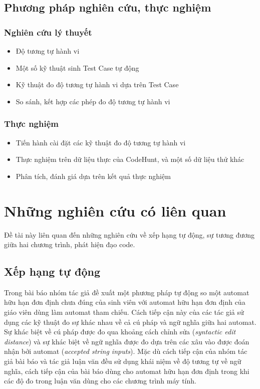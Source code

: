 \subsection*{Phương pháp nghiên cứu, thực nghiệm}
\subsubsection*{Nghiên cứu lý thuyết}
\begin{itemize}
\item Độ tương tự hành vi
\item Một số kỹ thuật sinh Test Case tự động
\item Kỹ thuật đo độ tương tự hành vi dựa trên Test Case
\item So sánh, kết hợp các phép đo độ tương tự hành vi
\end{itemize}
		
\subsubsection*{Thực nghiệm}
\begin{itemize}
\item Tiến hành cài đặt các kỹ thuật đo độ tương tự hành vi
\item Thực nghiệm trên dữ liệu thực của CodeHunt, và một số dữ liệu thử khác
\item Phân tích, đánh giá dựa trên kết quả thực nghiệm
\end{itemize}


\section{Những nghiên cứu có liên quan}

Đề tài này liên quan đến những nghiên cứu về xếp hạng tự động, sự
tương đương giữa hai chương trình, phát hiện đạo code.

\subsection*{Xếp hạng tự động}
	
Trong bài báo \cite{alur2013automated} nhóm tác giả đề xuất một phương
pháp tự động so một automat hữu hạn đơn định chưa đúng của sinh viên
với automat hữu hạn đơn định của giáo viên dùng làm automat tham
chiếu. Cách tiếp cận này của các tác giả sử dụng các kỹ thuật đo sự
khác nhau về cả cú pháp và ngữ nghĩa giữa hai automat. Sự khác biệt về
cú pháp được đo qua khoảng cách chỉnh sửa (\emph{syntactic edit
  distance}) và sự khác biệt về ngữ nghĩa được đo dựa trên các
xâu vào được đoán nhận bởi automat (\emph{accepted string
  inputs}). Mặc dù cách tiếp cận của nhóm tác giả bài báo và tác giả
luận văn đều sử dụng khái niệm về độ tương tự về ngữ nghĩa, cách tiếp
cận của bài báo dùng cho automat hữu hạn đơn định trong khi các độ đo
trong luận văn dùng cho các chương trình máy tính.

